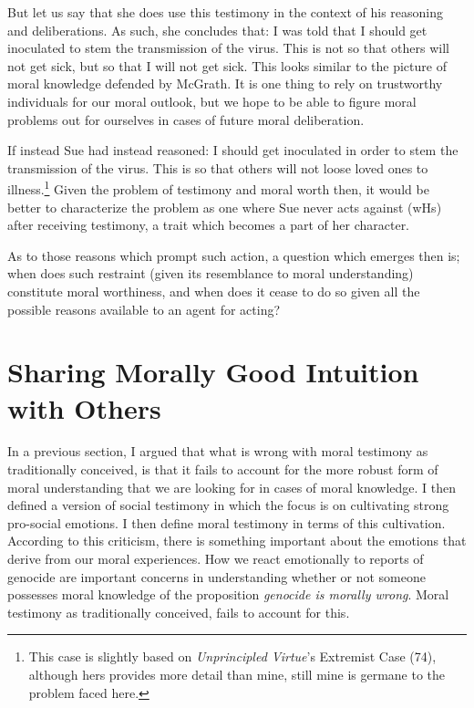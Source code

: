 \documentclass[phdthesis,12pt,final]{wuthesis}
\theoremstyle{definition}
\theoremstyle{definition}
\theoremstyle{definition}
\theoremstyle{definition}
\theoremstyle{remark}
\begin{document}
But let us say that she does use this testimony in the context of his reasoning and deliberations. As such, she concludes that: I was told that I should get inoculated to stem the transmission of the virus. This is not so that others will not get sick, but so that I will not get sick. This looks similar to the picture of moral knowledge defended by McGrath. It is one thing to rely on trustworthy individuals for our moral outlook, but we hope to be able to figure moral problems out for ourselves in cases of future moral deliberation.

If instead Sue had instead reasoned: I should get inoculated in order to stem the transmission of the virus. This is so that others will not loose loved ones to illness.\footnote{This case is slightly based on \emph{Unprincipled {Virtue}}'s Extremist Case (74), although hers provides more detail than mine, still mine is germane to the problem faced here.} Given the problem of testimony and moral worth then, it would be better to characterize the problem as one where Sue never acts against (wHs) after receiving testimony, a trait which becomes a part of her character.

As to those reasons which prompt such action, a question which emerges then is; when does such restraint (given its resemblance to moral understanding) constitute moral worthiness, and when does it cease to do so given all the possible reasons available to an agent for acting?

\chapter{Sharing Morally Good Intuition with Others}\label{sharing-morally-good-intuition-with-others}

In a previous section, I argued that what is wrong with moral testimony as traditionally conceived, is that it fails to account for the more robust form of moral understanding that we are looking for in cases of moral knowledge. I then defined a version of social testimony in which the focus is on cultivating strong pro-social emotions. I then define moral testimony in terms of this cultivation. According to this criticism, there is something important about the emotions that derive from our moral experiences. How we react emotionally to reports of genocide are important concerns in understanding whether or not someone possesses moral knowledge of the proposition \emph{genocide is morally wrong}. Moral testimony as traditionally conceived, fails to account for this.
\end{document}
